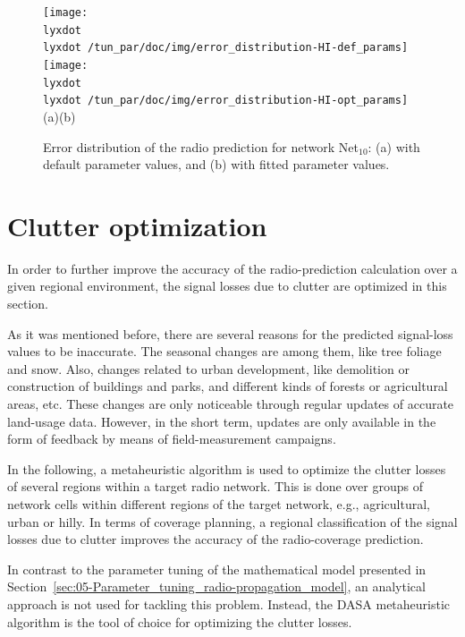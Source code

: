 \begin{figure}[H]
\centering

\texttt{[image: \\lyxdot \\lyxdot /tun\_par/doc/img/error\_distribution-HI-def\_params]}\texttt{[image: \\lyxdot \\lyxdot /tun\_par/doc/img/error\_distribution-HI-opt\_params]}\\\hspace{0.4cm}(a)\hspace{6.7cm}(b)

\caption{Error distribution of the radio prediction for network Net$_{10}$:
(a) with default parameter values, and (b) with fitted parameter values.\label{fig:05-Error_distribution_for_Net10}}
\end{figure}



\section{Clutter optimization \label{sec:05-Clutter_optimization}}

In order to further improve the accuracy of the radio-prediction calculation
over a given regional environment, the signal losses due to clutter
are optimized in this section.

As it was mentioned before, there are several reasons for the predicted
signal-loss values to be inaccurate. The seasonal changes are among
them, like tree foliage and snow. Also, changes related to urban development,
like demolition or construction of buildings and parks, and different
kinds of forests or agricultural areas, etc. These changes are only
noticeable through regular updates of accurate land-usage data. However,
in the short term, updates are only available in the form of feedback
by means of field-measurement campaigns.

In the following, a metaheuristic algorithm is used to optimize the
clutter losses of several regions within a target radio network. This
is done over groups of network cells within different regions of the
target network, e.g., agricultural, urban or hilly. In terms of coverage
planning, a regional classification of the signal losses due to clutter
improves the accuracy of the radio-coverage prediction.

In contrast to the parameter tuning of the mathematical model presented
in Section~\ref{sec:05-Parameter_tuning_radio-propagation_model},
an analytical approach is not used for tackling this problem. Instead,
the DASA metaheuristic algorithm is the tool of choice for optimizing
the clutter losses.

